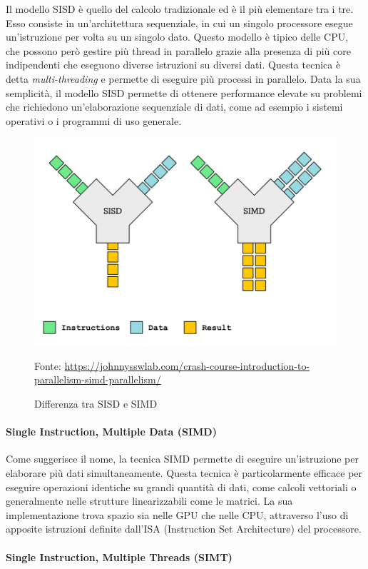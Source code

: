 Il modello SISD è quello del calcolo tradizionale ed è il più elementare tra i
tre. Esso consiste in un'architettura sequenziale, in cui un singolo processore
esegue un'istruzione per volta su un singolo dato. Questo modello è tipico delle
CPU, che possono però gestire più thread in parallelo grazie alla presenza di
più core indipendenti che eseguono diverse istruzioni su diversi dati. Questa tecnica
è detta \textit{multi-threading} e permette di eseguire più processi in
parallelo. Data la sua semplicità, il modello SISD permette di ottenere
performance elevate su problemi che richiedono un'elaborazione sequenziale di
dati, come ad esempio i sistemi operativi o i programmi di uso generale.

\begin{figure}[h!]
  \centering
  \includegraphics[width=.40\linewidth]{images/examples/sisd-simd.png}
  \caption{Differenza tra SISD e SIMD}
  \label{fig:sisd-simt} \footnotesize{Fonte: \url{https://johnnysswlab.com/crash-course-introduction-to-parallelism-simd-parallelism/}}
\end{figure}

\paragraph{Single Instruction, Multiple Data (SIMD)}
\label{para:simd}

Come suggerisce il nome, la tecnica SIMD permette di eseguire un'istruzione per elaborare
più dati simultaneamente. Questa tecnica è particolarmente efficace per eseguire
operazioni identiche su grandi quantità di dati, come calcoli vettoriali o generalmente
nelle strutture linearizzabili come le matrici. La sua implementazione trova
spazio sia nelle GPU che nelle CPU, attraverso l'uso di apposite istruzioni definite
dall'ISA (Instruction Set Architecture) del processore.

\paragraph{Single Instruction, Multiple Threads (SIMT)\cite{generalpurposegpu}}
\label{para:simt}

